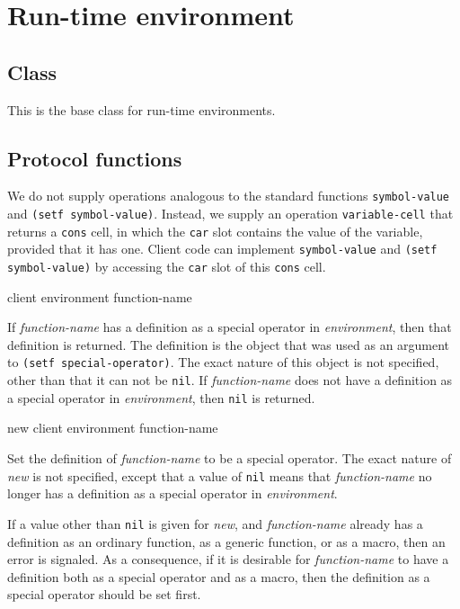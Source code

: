 \chapter{Run-time environment}

\section{Class}


This is the base class for run-time environments.

\section{Protocol functions}
\label{sec-run-time-protocol-functions}

We do not supply operations analogous to the standard functions
\texttt{symbol-value} and \texttt{(setf symbol-value)}.  Instead, we
supply an operation \texttt{variable-cell} that returns a
\texttt{cons} cell, in which the \texttt{car} slot contains the value
of the variable, provided that it has one.  Client code can implement
\texttt{symbol-value} and \texttt{(setf symbol-value)} by accessing
the \texttt{car} slot of this \texttt{cons} cell.

 {client environment function-name}

If \textit{function-name} has a definition as a special operator in
\textit{environment}, then that definition is returned.  The
definition is the object that was used as an argument to \texttt{(setf
  special-operator)}.  The exact nature of this object is not
specified, other than that it can not be \texttt{nil}.  If
\textit{function-name} does not have a definition as a special
operator in \textit{environment}, then \texttt{nil} is returned.

 {new client environment function-name}

Set the definition of \textit{function-name} to be a special operator.
The exact nature of \textit{new} is not specified, except that a
value of \texttt{nil} means that \textit{function-name} no longer has
a definition as a special operator in \textit{environment}.

If a value other than \texttt{nil} is given for \textit{new}, and
\textit{function-name} already has a definition as an ordinary
function, as a generic function, or as a macro, then an error is
signaled.  As a consequence, if it is desirable for
\textit{function-name} to have a definition both as a special operator
and as a macro, then the definition as a special operator should be
set first.

